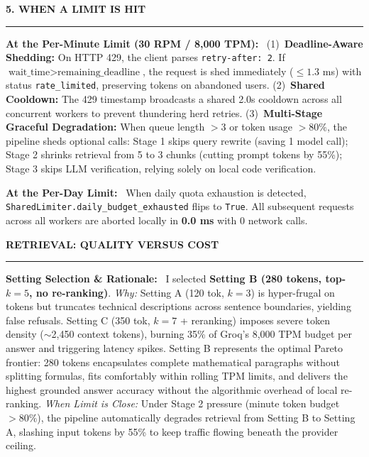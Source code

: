 \documentclass[10pt,a4paper]{article}
\newcommand{\secheader}[1]{\vspace{0.2em}\noindent\textbf{\small\MakeUppercase{#1}}\vspace{0.05em}\par\hrule\vspace{0.12em}}
\newcommand{\subhead}[1]{\noindent\textbf{#1}\ }
\begin{document}
\secheader{5. When a Limit is Hit}
\subhead{At the Per-Minute Limit (30 RPM / 8,000 TPM):}
(1)~\textbf{Deadline-Aware Shedding:} On HTTP 429, the client parses \texttt{retry-after: 2}. If $\text{wait\_time} > \text{remaining\_deadline}$, the request is shed immediately ($\le 1.3$ ms) with status \texttt{rate\_limited}, preserving tokens on abandoned users.
(2)~\textbf{Shared Cooldown:} The 429 timestamp broadcasts a shared 2.0s cooldown across all concurrent workers to prevent thundering herd retries.
(3)~\textbf{Multi-Stage Graceful Degradation:} When queue length $>3$ or token usage $>80\%$, the pipeline sheds optional calls: Stage 1 skips query rewrite (saving 1 model call); Stage 2 shrinks retrieval from 5 to 3 chunks (cutting prompt tokens by 55\%); Stage 3 skips LLM verification, relying solely on local code verification.

\subhead{At the Per-Day Limit:}
When daily quota exhaustion is detected, \texttt{SharedLimiter.daily\_budget\_exhausted} flips to \texttt{True}. All subsequent requests across all workers are aborted locally in \textbf{0.0 ms} with 0 network calls.

\secheader{Retrieval: Quality Versus Cost}
\subhead{Setting Selection \& Rationale:}
I selected \textbf{Setting B (280 tokens, top-$k=5$, no re-ranking)}.
\textit{Why:} Setting A (120 tok, $k=3$) is hyper-frugal on tokens but truncates technical descriptions across sentence boundaries, yielding false refusals. Setting C (350 tok, $k=7$ + reranking) imposes severe token density ($\sim$2,450 context tokens), burning 35\% of Groq's 8,000 TPM budget per answer and triggering latency spikes. Setting B represents the optimal Pareto frontier: 280 tokens encapsulates complete mathematical paragraphs without splitting formulas, fits comfortably within rolling TPM limits, and delivers the highest grounded answer accuracy without the algorithmic overhead of local re-ranking.
\textit{When Limit is Close:} Under Stage 2 pressure (minute token budget $>80\%$), the pipeline automatically degrades retrieval from Setting B to Setting A, slashing input tokens by 55\% to keep traffic flowing beneath the provider ceiling.
\end{document}

